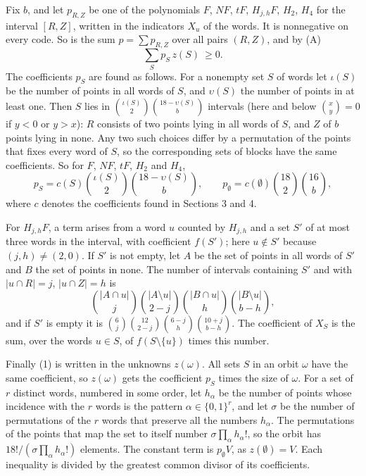 \documentclass[11pt,a4paper]{article}
\newcommand{\abs}[1]{\lvert #1\rvert}
\begin{document}
Fix $b$, and let $p_{R,Z}$ be one of the polynomials $F$, $N\!F$, $tF$,
$H_{j,h}F$, $H_2$, $H_4$ for the interval $[R,Z]$, written in the
indicators $X_u$ of the words. It is nonnegative on every code. So is the
sum $p=\sum p_{R,Z}$ over all pairs $(R,Z)$, and by (A)
\begin{equation}
\sum_Sp_S\,z(S)\ \ge 0. \tag{1}
\end{equation}
The coefficients $p_S$ are found as follows. For a nonempty set $S$ of
words let $\iota(S)$ be the number of points in all words of $S$, and
$\upsilon(S)$ the number of points in at least one. Then $S$ lies in
$\binom{\iota(S)}2\binom{18-\upsilon(S)}b$ intervals (here and below
$\binom xy=0$ if $y<0$ or $y>x$): $R$ consists of two points lying in all
words of $S$, and $Z$ of $b$ points lying in none. Any two such choices
differ by a permutation of the points that fixes every word of $S$, so the
corresponding sets of blocks have the same coefficients. So for $F$,
$N\!F$, $tF$, $H_2$ and $H_4$,
\[
p_S=c(S)\binom{\iota(S)}2\binom{18-\upsilon(S)}b,\qquad
p_\emptyset=c(\emptyset)\binom{18}2\binom{16}b ,
\]
where $c$ denotes the coefficients found in Sections 3 and 4.

For $H_{j,h}F$, a term arises from a word $u$ counted by $H_{j,h}$ and a
set $S'$ of at most three words in the interval, with coefficient
$f(S')$; here $u\notin S'$ because $(j,h)\ne(2,0)$. If $S'$ is not empty,
let $A$ be the set of points in all words of $S'$ and $B$ the set of points
in none. The number of intervals containing $S'$ and with
$\abs{u\cap R}=j$, $\abs{u\cap Z}=h$ is
\[
\binom{\abs{A\cap u}}j\binom{\abs{A\setminus u}}{2-j}
\binom{\abs{B\cap u}}h\binom{\abs{B\setminus u}}{b-h},
\]
and if $S'$ is empty it is
$\binom6j\binom{12}{2-j}\binom{6-j}h\binom{10+j}{b-h}$. The coefficient
of $X_S$ is the sum, over the words $u\in S$, of $f(S\setminus\{u\})$
times this number.

Finally (1) is written in the unknowns $z(\omega)$. All sets $S$ in an
orbit $\omega$ have the same coefficient, so $z(\omega)$ gets the
coefficient $p_S$ times the size of $\omega$. For a set of $r$ distinct words, numbered in some order, let
$h_\alpha$ be the number of points whose incidence with the $r$ words is
the pattern $\alpha\in\{0,1\}^r$, and let $\sigma$ be the number of
permutations of the $r$ words that preserve all the numbers $h_\alpha$.
The permutations of the points that map the set to itself number
$\sigma\prod_\alpha h_\alpha!$, so the orbit has
$18!/(\sigma\prod_\alpha h_\alpha!)$ elements. The constant term is
$p_\emptyset V$, as $z(\emptyset)=V$. Each inequality is divided by the
greatest common divisor of its coefficients.
\end{document}
